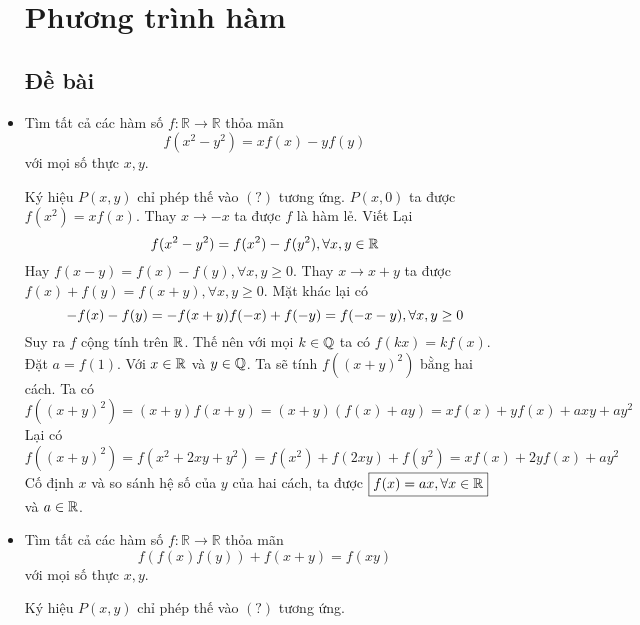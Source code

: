 \documentclass[11pt]{scrartcl}
\begin{document}
\begin{itemize}[label=, leftmargin=0em, itemsep=0.5em]
    \thispagestyle{plain}

    \section{\huge Phương trình hàm}
    \subsection{\LARGE \textcolor{dk}{Đề bài}}
    \vspace{1em}
    \item \begin{bt}
        Tìm tất cả các hàm số $f: \mathbb{R} \to \mathbb{R}$ thỏa mãn
        \[
           f(x^2 - y^2) = xf(x) - yf(y)
        \]
        với mọi số thực $x,y$.
    \end{bt}
    \begin{sol}
        Ký hiệu $P(x,y)$ chỉ phép thế vào $(?)$ tương ứng. $P(x,0)$ ta được $f(x^2) = xf(x)$. Thay $x \to -x$ ta được $f$ là hàm lẻ. Viết Lại
        \[
            f(x^2 - y^2) = f(x^2) - f(y^2), \forall x,y \in \mathbb{R}
        \]
        Hay $f(x - y) = f(x) - f(y) ,\forall x, y \geq 0$. Thay $x \to x + y$ ta được $f(x) + f(y) = f(x + y), \forall x,y \geq 0$. Mặt khác lại có 
        \[
            -f(x) - f(y) = -f(x + y) \lra f(-x) + f(-y) = f(-x-y),\forall x,y \geq 0
        \]
        Suy ra $f$ cộng tính trên $\mathbb{R}$. Thế nên với mọi $k \in \mathbb{Q}$ ta có $f(kx) = kf(x)$. Đặt $a = f(1)$. Với $x \in \mathbb{R}$ và $y \in \mathbb{Q}$. Ta sẽ tính $f((x + y)^2)$ bằng hai cách. Ta có 
        \[
        f((x + y)^2) = (x + y)f(x + y) = (x + y)(f(x) + ay) = xf(x) + yf(x) + axy + ay^2
        \]
        Lại có 
        \[
        f((x + y)^2) = f(x^2 + 2xy + y^2) = f(x^2) + f(2xy) + f(y^2) = xf(x) + 2yf(x) + ay^2
        \]
        Cố định $x$ và so sánh hệ số của $y$ của hai cách, ta được $\boxed{f(x) = ax, \forall x\in \mathbb{R}}$ và $a \in \mathbb{R}$.
    \end{sol}
    \item \begin{bt}
        Tìm tất cả các hàm số $f: \mathbb{R} \to \mathbb{R}$ thỏa mãn
        \[
           f(f(x)f(y)) + f(x + y) = f(xy)\tag{1}
        \]
        với mọi số thực $x,y$.
    \end{bt}
    \begin{sol}
        Ký hiệu $P(x,y)$ chỉ phép thế vào $(?)$ tương ứng. 
    

\end{sol}
\end{itemize}
\end{document}
